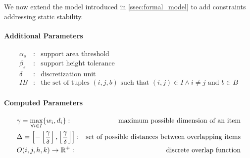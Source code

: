 We now extend the model introduced in \cref{ssec:formal_model} to add constraints addressing static stability.

\paragraph*{Additional Parameters}
\begin{eqnarray*}
    \alpha_s  &:& \text{support area threshold} \\
    \beta_s  &:& \text{support height tolerance} \\
    \delta      &:& \text{discretization unit} \\
    IB &:& \text{the set of tuples $(i, j, b)$ such that $(i,j) \in I \land i \neq j$ and $b \in B$}
\end{eqnarray*}


\paragraph*{Computed Parameters}
\begin{eqnarray}
    & \gamma = \max_{\forall i \in I}\{ w_i, d_i \}  :& \text{maximum possible dimension of an item} \notag \\
    & \Delta =  \left[ - \left\lfloor \frac{ \gamma }{\delta} \right\rfloor, \left\lfloor \frac{ \gamma }{\delta} \right\rfloor \right]  :& \text{set of possible distances between overlapping items} \notag \\
    & O(i, j, h, k) \rightarrow \mathbb{R}^+ :& \text{discrete overlap function} \label{eq:overlap_function}
\end{eqnarray}

